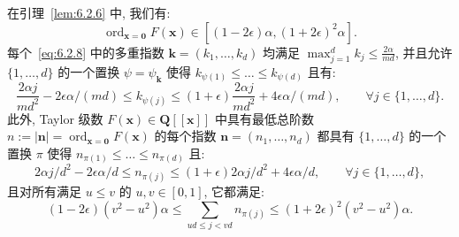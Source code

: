 \begin{corollary}\label{cor:6.2.11}
在引理~\ref{lem:6.2.6} 中, 我们有:
\begin{equation}\label{eq:6.2.12}
\operatorname{ord}_{\mathbf{x}=\mathbf{0}} F(\mathbf{x}) \in [(1-2\epsilon)\alpha, (1+2\epsilon)^2 \alpha].
\end{equation}
每个~\eqref{eq:6.2.8} 中的多重指数 $\mathbf{k} = (k_1, \dots, k_d)$ 均满足 $\max_{j=1}^d k_j \leq \frac{2\alpha}{md}$, 并且允许 $\{1, \dots, d\}$ 的一个置换 $\psi = \psi_{\mathbf{k}}$ 使得 $k_{\psi(1)} \leq \dots \leq k_{\psi(d)}$ 且有:
\begin{equation}\label{eq:6.2.13}
\frac{2\alpha j}{md^2} - 2\epsilon \alpha/(md) \le k_{\psi(j)} \le (1+\epsilon) \frac{2\alpha j}{md^2} + 4\epsilon \alpha/(md), \qquad \forall j \in \{1, \dots, d\}.
\end{equation}
此外, Taylor 级数 $F(\mathbf{x}) \in \mathbf{Q}[\![\mathbf{x}]\!]$ 中具有最低总阶数 $n := |\mathbf{n}| = \operatorname{ord}_{\mathbf{x} = \mathbf{0}} F(\mathbf{x})$ 的每个指数 $\mathbf{n} = (n_1, \dots, n_d)$ 都具有 $\{1,\ldots,d\}$ 的一个置换 $\pi$ 使得 $n_{\pi(1)} \leq \dots \leq n_{\pi(d)}$ 且:
\begin{equation}\label{eq:6.2.14}
2\alpha j/d^2 - 2\epsilon \alpha/d \le n_{\pi(j)} \le (1+\epsilon)2\alpha j/d^2 + 4\epsilon \alpha/d, \qquad \forall j \in \{1, \dots, d\},
\end{equation}
且对所有满足 $u \leq v$ 的 $u, v \in [0, 1]$, 它都满足:
\begin{equation}\label{eq:6.2.15}
(1 - 2\epsilon)(v^2 - u^2)\alpha \le \sum_{ud \le j < vd} n_{\pi(j)} \le (1 + 2\epsilon)^2 (v^2 - u^2)\alpha.
\end{equation}
\end{corollary}

